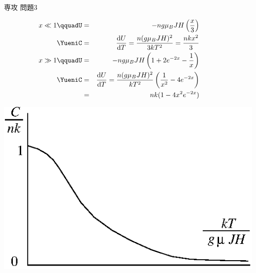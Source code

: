\documentclass[fleqn]{jbook}
\begin{document}
\begin{answer}{専攻 問題3}{}
\begin{subanswers}
  \parbox[t]{88mm}{
  \begin{eqnarray*}
     \hspace{-10mm}x\ll 1 \qquad%
     U &=& -ng \mu_B JH \left( \frac{x}{3} \right) \\
     \Yueni%
     C &=& \Deriver{U}{T} =\frac{n(g\mu_BJH)^2}{3kT^2}%
        = \frac{nkx^2}{3} \\
     \hspace{-10mm}x\gg 1 \qquad%
     U &=& -ng \mu_B JH \left( 1+2e^{-2x}-\frac{1}{x} \right) \\
     \Yueni%
     C &=& \Deriver{U}{T}%
       = \frac{n(g\mu_BJH)^2}{kT^2}\left(\frac{1}{x^2}-4e^{-2x}\right)\\
       &=& nk(1-4x^2e^{-2x})
  \end{eqnarray*}
%
  }\parbox[t]{75mm}{
  \begin{center}
    \mbox{\includegraphics[clip]{1994phy3-3.eps}}
  \end{center}}

\end{subanswers}
\end{answer}
\end{document}
